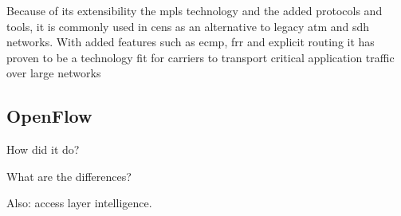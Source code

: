 Because of its extensibility the \ac{mpls} technology and the added protocols and tools, it is commonly used in \acp{cen} as an alternative to legacy \acs{atm} and \acs{sdh} networks. With added features such as \ac{ecmp}, \ac{frr} and explicit routing it has proven to be a technology fit for carriers to transport critical application traffic over large networks


\subsection{OpenFlow} %
\label{sub:openflow}

How did it do?

What are the differences?


Also: access layer intelligence.

